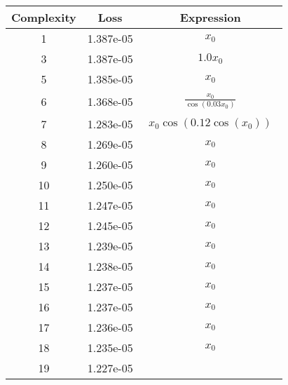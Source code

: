 \begin{center}
        \begin{tabular}{|c|c|c|}
        \hline
        Complexity & Loss & Expression \\
        \hline
        1 & 1.387e-05 & $\begin{aligned}x_{0}\end{aligned}$\\ \hline3 & 1.387e-05 & $\begin{aligned}1.0 x_{0}\end{aligned}$\\ \hline5 & 1.385e-05 & $\begin{aligned}x_{0}\end{aligned}$\\ \hline6 & 1.368e-05 & $\begin{aligned}\frac{x_{0}}{\cos{\left(0.03 x_{0} \right)}}\end{aligned}$\\ \hline7 & 1.283e-05 & $\begin{aligned}x_{0} \cos{\left(0.12 \cos{\left(x_{0} \right)} \right)}\end{aligned}$\\ \hline8 & 1.269e-05 & $\begin{aligned}x_{0}\end{aligned}$\\ \hline9 & 1.260e-05 & $\begin{aligned}x_{0}\end{aligned}$\\ \hline10 & 1.250e-05 & $\begin{aligned}x_{0}\end{aligned}$\\ \hline11 & 1.247e-05 & $\begin{aligned}x_{0}\end{aligned}$\\ \hline12 & 1.245e-05 & $\begin{aligned}x_{0}\end{aligned}$\\ \hline13 & 1.239e-05 & $\begin{aligned}x_{0}\end{aligned}$\\ \hline14 & 1.238e-05 & $\begin{aligned}x_{0}\end{aligned}$\\ \hline15 & 1.237e-05 & $\begin{aligned}x_{0}\end{aligned}$\\ \hline16 & 1.237e-05 & $\begin{aligned}x_{0}\end{aligned}$\\ \hline17 & 1.236e-05 & $\begin{aligned}x_{0}\end{aligned}$\\ \hline18 & 1.235e-05 & $\begin{aligned}x_{0}\end{aligned}$\\ \hline19 & 1.227e-05 & 
\end{tabular}
\end{center}
